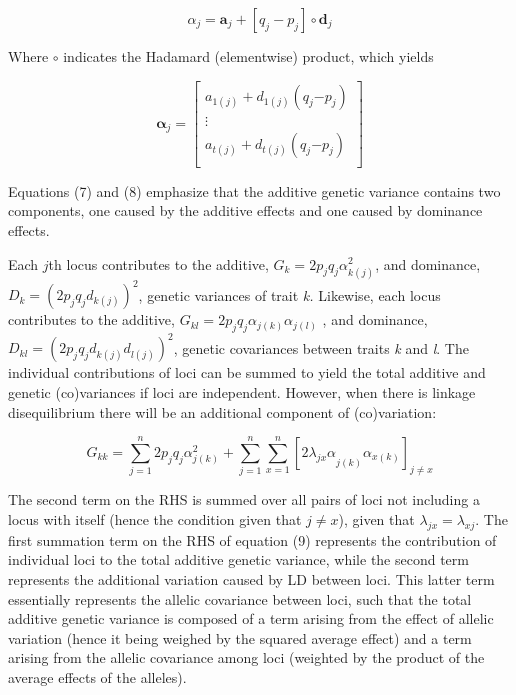\begin{refsection}
\begin{equation}
\alpha_{j} = \textbf{a}_{j} + \left\lbrack q_{j} - p_{j} \right\rbrack \circ \textbf{d}_{j}
\end{equation}

Where \(\circ\) indicates the Hadamard (elementwise) product, which
yields

\begin{equation}
\mathbf{\alpha}_{j}\mathbf{=}\begin{bmatrix}
a_{1(j)} + d_{1(j)}(q_{j}{- p}_{j}) \\
 \vdots \\
a_{t(j)} + d_{t(j)}(q_{j}{- p}_{j}) \\
\end{bmatrix}
\end{equation}

Equations (7) and (8) emphasize that the additive genetic variance
contains two components, one caused by the additive effects and one
caused by dominance effects.

Each $j$th locus contributes to the additive,
\(G_{k} = 2p_{j}q_{j}\alpha_{k(j)}^{2}\), and
dominance, \(D_{k} = \left( 2p_{j}q_{j}d_{k(j)} \right)^{2}\), genetic
variances of trait \emph{k.} Likewise, each locus contributes to the
additive, \(G_{kl} = 2p_{j}q_{j}\alpha_{j(k)}\alpha_{j(l)}\) ,
and dominance,
\(D_{kl} = \left( 2p_{j}q_{j}d_{k(j)}d_{l(j)} \right)^{2}\),
genetic covariances between traits \emph{k} and \emph{l}. The individual
contributions of loci can be summed to yield the total additive and
genetic (co)variances if loci are independent. However, when there is
linkage disequilibrium there will be an additional component of
(co)variation:

\begin{equation}
G_{kk} = \sum_{j=1}^n 2p_{j}q_{j}\alpha_{j(k)}^{2} + \sum_{j=1}^n \sum_{x=1}^n \left\lbrack {2\lambda_{jx}\alpha}_{j(k)}\alpha_{x(k)} \right\rbrack_{j \neq x}
\end{equation}

The second term on the RHS is summed over all pairs of loci not
including a locus with itself (hence the condition given that
\(j \neq x\)), given that \(\lambda_{jx} = \lambda_{xj}\).
The first summation term on the RHS of equation (9) represents the
contribution of individual loci to the total additive genetic variance,
while the second term represents the additional variation caused by LD
between loci. This latter term essentially represents the allelic
covariance between loci, such that the total additive genetic variance
is composed of a term arising from the effect of allelic variation
(hence it being weighed by the squared average effect) and a term
arising from the allelic covariance among loci (weighted by the product
of the average effects of the alleles).


\end{refsection}
